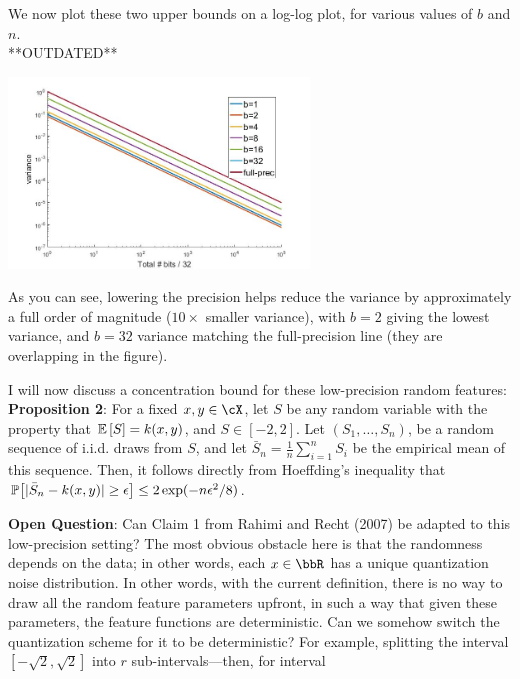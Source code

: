 \documentclass[12pt]{article}
\newcommand{\bS}{\bar{S}}
\newcommand{\sq}{\sqrt{2}}
\newcommand{\eps}{\epsilon}
\begin{document}
We now plot these two upper bounds on a log-log plot, for various values of $b$ and $n$.\\
**OUTDATED**
\begin{center}
\includegraphics[width=0.6\textwidth]{lprff_variance_figure.jpg}
\end{center}
As you can see, lowering the precision helps reduce the variance by approximately a full order of magnitude ($10\times$ smaller variance), with $b=2$ giving the lowest variance, and $b=32$ variance matching the full-precision line (they are overlapping in the figure).

I will now discuss a concentration bound for these low-precision random features:\\
\textbf{Proposition 2}: For a fixed $x,y\in\cX$, let $S$ be any random variable with the property that $\expect{}{S} = k(x,y)$, and $S \in [-2,2]$.  Let $(S_1,\ldots,S_n)$, be a random sequence of i.i.d. draws from $S$, and let $\bS_n = \frac{1}{n}\sum_{i=1}^n S_i$ be the empirical mean of this sequence.  Then, it follows directly from Hoeffding's inequality that $\Prob{\big[|\bS_n - k(x,y)| \geq \epsilon\big]} \leq 2\exp(-n\eps^2/8)$.

\textbf{Open Question}: Can Claim 1 from Rahimi and Recht (2007) be adapted to this low-precision setting?  The most obvious obstacle here is that the randomness depends on the data; in other words, each $x \in \RR$ has a unique quantization noise distribution.  In other words, with the current definition, there is no way to draw all the random feature parameters upfront, in such a way that given these parameters, the feature functions are deterministic.  Can we somehow switch the quantization scheme for it to be deterministic?  For example, splitting the interval $[-\sq,\sq]$ into $r$ sub-intervals---then, for interval
\end{document}
